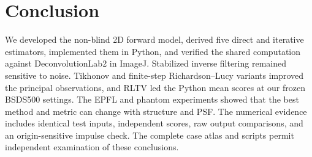 \section{Conclusion}

We developed the non-blind 2D forward model, derived five direct and iterative estimators, implemented them in Python, and verified the shared computation against DeconvolutionLab2 in ImageJ. Stabilized inverse filtering remained sensitive to noise. Tikhonov and finite-step Richardson--Lucy variants improved the principal observations, and RLTV led the Python mean scores at our frozen BSDS500 settings. The EPFL and phantom experiments showed that the best method and metric can change with structure and PSF. The numerical evidence includes identical test inputs, independent scores, raw output comparisons, and an origin-sensitive impulse check. The complete case atlas and scripts permit independent examination of these conclusions.
